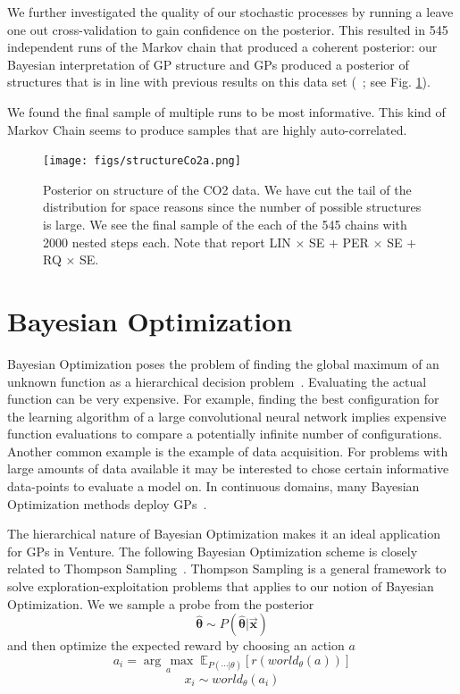 \documentclass{article} %
\newcommand{\argmax}[1]{\underset{#1}{\operatorname{arg}\,\operatorname{max}}\;}
\begin{document}
We further investigated the quality of our stochastic processes by running a leave one out cross-validation to gain confidence on the posterior. This resulted in 545 independent runs of the Markov chain that produced a coherent posterior: our Bayesian interpretation of GP structure and GPs produced a posterior of structures that is in line with previous results on this data set (~\citealp*{duvenaud2013structure}; see Fig. \ref{fig:structureCo2}).

We found the final sample of multiple runs to be most informative. This kind of Markov Chain seems to produce samples that are highly auto-correlated.

\begin{figure}[p]

\centering
    \texttt{[image: figs/structureCo2a.png]}
    \caption{Posterior on structure of the CO2 data. We have cut the tail of the distribution for space reasons since the number of possible structures is large. We see the final sample of the each of the 545 chains with 2000 nested steps each. Note that \citet{duvenaud2013structure} report LIN $\times$ SE $+$ PER $\times$ SE $+$ RQ $\times$ SE.}\label{fig:structureCo2}
\end{figure}

\section{Bayesian Optimization}
Bayesian Optimization poses the problem of finding the global maximum of an unknown function as a hierarchical decision problem~\citep{ghahramani2015probabilistic}. Evaluating the actual function can be very expensive. For example, finding the best configuration for the learning algorithm of a large convolutional neural network implies expensive function evaluations to compare a potentially infinite number of configurations. Another common example is the example of data acquisition. For problems with large amounts of data available it may be interested to chose certain informative data-points to evaluate a model on. In continuous domains, many Bayesian Optimization methods deploy GPs~\citep[e.g.][]{snoek2012practical}.

The hierarchical nature of Bayesian Optimization makes it an ideal application for GPs in Venture. The following Bayesian Optimization scheme is closely related to Thompson Sampling~\cite{thompson1933likelihood}. Thompson Sampling is a general framework to solve exploration-exploitation problems that applies to our notion of Bayesian Optimization.
We we sample a probe from the posterior
\begin{equation}
\hat{\bm{\theta}} \sim P( \hat{\bm{\theta}}|\vec{\mathbf{x}}) 
\end{equation}
and then optimize the expected reward by choosing an action $a$
\begin{equation}
a_i = \argmax{a}\mathbb{E}_{P(\cdots|\theta)}[r(world_\theta(a))]
\end{equation}
\begin{equation}
x_i  \sim world_\theta(a_i) 
\end{equation}









\end{document}
